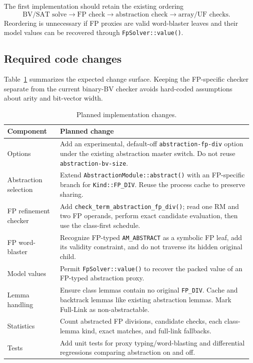 \documentclass[runningheads]{llncs}
\begin{document}
The first implementation should retain the existing ordering
\[
  \text{BV/SAT solve} \to \text{FP check} \to
  \text{abstraction check} \to \text{array/UF checks}.
\]
Reordering is unnecessary if FP proxies are valid word-blaster leaves and
their model values can be recovered through \texttt{FpSolver::value()}.

\subsection{Required code changes}

Table~\ref{tab:changes} summarizes the expected change surface.  Keeping the
FP-specific checker separate from the current binary-BV checker avoids
hard-coded assumptions about arity and bit-vector width.

\begin{table}[t]
\centering
\caption{Planned implementation changes.}
\label{tab:changes}
\small
\begin{tabular}{p{}p{}}
\toprule
Component & Planned change \\
\midrule
Options
  & Add an experimental, default-off \texttt{abstraction-fp-div} option under
    the existing abstraction master switch.  Do not reuse
    \texttt{abstraction-bv-size}. \\
Abstraction selection
  & Extend \texttt{AbstractionModule::abstract()} with an FP-specific branch
    for \texttt{Kind::FP\_DIV}.  Reuse the process cache to preserve sharing. \\
FP refinement checker
  & Add \texttt{check\_term\_abstraction\_fp\_div()}; read one RM and two FP
    operands, perform exact candidate evaluation, then use the class-first
    schedule. \\
FP word-blaster
  & Recognize FP-typed \texttt{AM\_ABSTRACT} as a symbolic FP leaf, add its
    validity constraint, and do not traverse its hidden original child. \\
Model values
  & Permit \texttt{FpSolver::value()} to recover the packed value of an
    FP-typed abstraction proxy. \\
Lemma handling
  & Ensure class lemmas contain no original \texttt{FP\_DIV}.  Cache and
    backtrack lemmas like existing abstraction lemmas.  Mark Full-Link as
    non-abstractable. \\
Statistics
  & Count abstracted FP divisions, candidate checks, each class-lemma kind,
    exact matches, and full-link fallbacks. \\
Tests
  & Add unit tests for proxy typing/word-blasting and differential regressions
    comparing abstraction on and off. \\
\bottomrule
\end{tabular}
\end{table}
\end{document}
